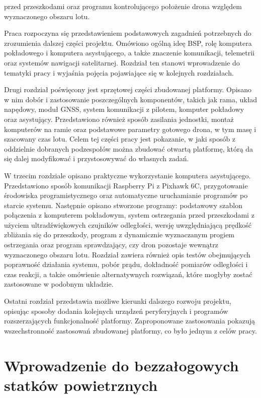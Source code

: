 \documentclass[a4paper,12pt]{book}
\begin{document}
    przed przeszkodami oraz programu kontrolującego położenie drona względem wyznaczonego obszaru lotu.\par
    Praca rozpoczyna się przedstawieniem podstawowych zagadnień potrzebnych do zrozumienia dalszej części projektu. Omówiono ogólną ideę BSP, rolę komputera pokładowego i komputera asystującego, a także znaczenie 
    komunikacji, telemetrii oraz systemów nawigacji satelitarnej. Rozdział ten stanowi wprowadzenie do tematyki pracy i wyjaśnia pojęcia pojawiające się w kolejnych rozdziałach.\par
    Drugi rozdział poświęcony jest sprzętowej części zbudowanej platformy. Opisano w nim dobór i zastosowanie poszczególnych komponentów, takich jak rama, układ napędowy, moduł GNSS, system komunikacji z pilotem, 
    komputer pokładowy oraz asystujący. Przedstawiono również sposób zasilania jednostki, montaż komputerów na ramie oraz podstawowe parametry gotowego drona, w tym masę i szacowany czas lotu. Celem tej części 
    pracy jest pokazanie, w jaki sposób z oddzielnie dobranych podzespołów można zbudować otwartą platformę, którą da się dalej modyfikować i przystosowywać do własnych zadań.\par
    W trzecim rozdziale opisano praktyczne wykorzystanie komputera asystującego. Przedstawiono sposób komunikacji Raspberry Pi z Pixhawk 6C, przygotowanie środowiska programistycznego oraz automatyczne 
    uruchamianie programów po starcie systemu. Następnie opisano stworzone programy: podstawowy szablon połączenia z komputerem pokładowym, system ostrzegania przed przeszkodami z użyciem ultradźwiękowych 
    czujników odległości, wersję uwzględniającą prędkość zbliżania się do przeszkody, program z dynamicznie wyznaczanym progiem ostrzegania oraz program sprawdzający, czy dron pozostaje wewnątrz 
    wyznaczonego obszaru lotu. Rozdział zawiera również opis testów obejmujących poprawność działania systemu, pobór prądu, dokładność pomiarów odległości i czas reakcji, a także omówienie 
    alternatywnych rozwiązań, które mogłyby zostać zastosowane w podobnym układzie.\par
    Ostatni rozdział przedstawia możliwe kierunki dalszego rozwoju projektu, opisując sposoby dodania kolejnych urządzeń peryferyjnych i programów rozszerzających funkcjonalność platformy. Zaproponowane 
    zastosowania pokazują wszechstronność zastosowań zbudowanej platformy, co było jednym z celów pracy.

\chapter{Wprowadzenie do bezzałogowych statków powietrznych}
\end{document}
